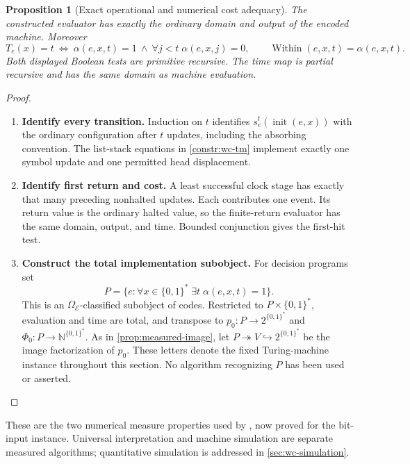 \documentclass[11pt,a4paper]{article}
\numberwithin{algorithm}{section}
\numberwithin{equation}{section}
\newtheorem{proposition}[proposition]{Proposition}
\theoremstyle{definition}
\theoremstyle{remark}
\theoremstyle{plain}
\newcommand{\E}{\mathcal E}
\newcommand{\Truth}{\Omega_{\E}}
\newcommand{\N}{\mathbb N}
\newcommand{\incl}{\hookrightarrow}
\newcommand{\onto}{\twoheadrightarrow}
\newcommand{\BinWords}{\{0,1\}^{*}}
\theoremstyle{definition}
\theoremstyle{plain}
\begin{document}
\begin{proposition}[Exact operational and numerical cost adequacy]
\label{prop:wc-tm-adequacy}
The constructed evaluator has exactly the ordinary domain and output
of the encoded machine. Moreover
\[
 T_e(x)=t\ \Longleftrightarrow\
 \alpha(e,x,t)=1\ \wedge\ \forall j<t\;\alpha(e,x,j)=0,
 \qquad
 \operatorname{Within}(e,x,t)=\alpha(e,x,t).
\]
Both displayed Boolean tests are primitive recursive. The time map is
partial recursive and has the same domain as machine evaluation.
\end{proposition}
\begin{proof}\leavevmode
\begin{enumerate}[leftmargin=*,align=left]
\item \textbf{Identify every transition.}
Induction on $t$ identifies $s_e^t(\operatorname{init}(e,x))$ with the
ordinary configuration after $t$ updates, including the absorbing
convention. The list-stack equations in \cref{constr:wc-tm} implement
exactly one symbol update and one permitted head displacement.
\item \textbf{Identify first return and cost.}
A least successful clock stage has exactly that many preceding
nonhalted updates. Each contributes one event. Its return value is the
ordinary halted value, so the finite-return evaluator has the same
domain, output, and time. Bounded conjunction gives the first-hit test.
\item \textbf{Construct the total implementation subobject.}
For decision programs set
\[
 P=\{e:\forall x\in\BinWords\;\exists t\;\alpha(e,x,t)=1\}.
\]
This is an $\Truth$-classified subobject of codes. Restricted to
$P\times\BinWords$, evaluation and time are total, and transpose to
$p_0:P\to2^{\BinWords}$ and $\Phi_0:P\to\N^{\BinWords}$.
As in \cref{prop:measured-image}, let $P\onto V\incl2^{\BinWords}$
be the image factorization of $p_0$. These letters denote the
fixed Turing-machine instance throughout this section.
No algorithm recognizing $P$ has been used or asserted.
\end{enumerate}
\end{proof}

These are the two numerical measure properties used by \citet{Blum1967MachineIndependentComplexity},
now proved for the bit-input instance. Universal interpretation and
machine simulation are separate measured algorithms; quantitative
simulation is addressed in \cref{sec:wc-simulation}.
\end{document}
